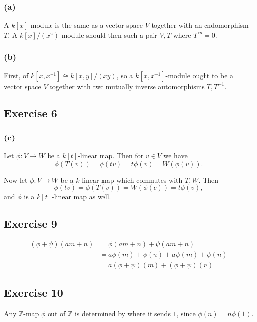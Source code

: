 \documentclass{article}
\theoremstyle{definition}
\newcommand{\Z}{\mathbb{Z}}
\begin{document}
\subsubsection*{(a)}

A $k[x]$-module is the same as a vector space $V$ together with an
endomorphism $T$. A $k[x]/(x^n)$-module should then such a pair $V, T$ where
$T^{\circ n} = 0$. 

\subsubsection*{(b)}

First, of $k[x, x^{-1}] \cong k[x, y]/(xy)$, so a $k[x, x^{-1}]$-module ought
to be a vector space $V$ together with two mutually inverse automorphisms $T,
T^{-1}$.


\subsection*{Exercise 6}

\subsubsection*{(c)}

Let $\phi : V \to W$ be a $k[t]$-linear map. Then for $v \in V$ we have 
\[
	\phi(T(v))
	=
	\phi(t v)
	=
	t \phi(v)
	=
	W(\phi(v)).
\] 

Now let $\phi : V \to W$ be a $k$-linear map which commutes with $T, W$. Then 
\[
	\phi(t v)
	=
	\phi(T(v))
	=
	W(\phi(v))
	=
	t \phi(v),
\]
and $\phi$ is a $k[t]$-linear map as well.

\subsection*{Exercise 9}

\begin{align*}
	(\phi + \psi)(am + n)
	&=
	\phi(a m + n) + \psi(am + n) \\
	&= 
	a\phi(m) + \phi(n) + a\psi(m) + \psi(n) \\
	&=
	a(\phi + \psi)(m) + (\phi + \psi)(n)
\end{align*}

\subsection*{Exercise 10}

Any $\Z$-map $\phi$ out of $\Z$ is determined by where it sends $1$, since
$\phi(n) = n\phi(1)$. \\ 
\end{document}
